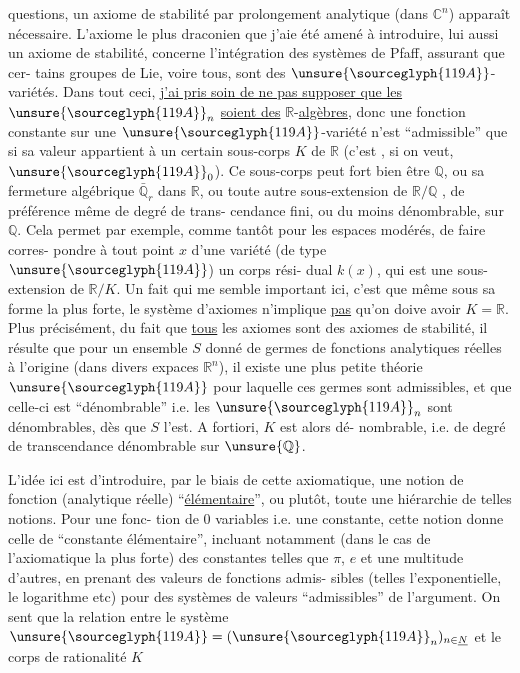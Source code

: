 
questions, un axiome de stabilité par prolongement analytique
(dans $\mathbb{C}^{n}$) apparaît nécessaire. L'axiome le plus draconien que
j'aie été amené à introduire, lui aussi un axiome de stabilité,
concerne l'intégration des systèmes de Pfaff, assurant que cer-%
tains groupes de Lie, voire tous, sont des $\unsure{\sourceglyph{119A}}$-variétés. Dans tout
ceci, \uline{j'ai pris soin de ne pas supposer que les} $\unsure{\sourceglyph{119A}}_{n}$ \uline{soient des}
\uline{$\mathbb{R}$}-\uline{algèbres}, donc une fonction constante sur une $\unsure{\sourceglyph{119A}}$-variété n'est
``admissible'' que si sa valeur appartient à un certain sous-corps
$K$ de $\mathbb{R}$ (c'est , si on veut, $\unsure{\sourceglyph{119A}}_{0}$). Ce sous-corps peut fort bien
être $\mathbb{Q}$, ou sa fermeture algébrique $\bar{\mathbb{Q}}_{r}$ dans $\mathbb{R}$, ou toute autre
sous-extension de $\mathbb{R}/\mathbb{Q}$ , de préférence même de degré de trans-%
cendance fini, ou du moins dénombrable, sur $\mathbb{Q}$. Cela permet par
exemple, comme tantôt pour les espaces modérés, de faire corres-%
pondre à tout point $x$ d'une variété (de type $\unsure{\sourceglyph{119A}}$) un corps rési-%
dual $k(x)$, qui est une sous-extension de $\mathbb{R}/K$. Un fait qui me
semble important ici, c'est que même sous sa forme la plus forte,
le système d'axiomes n'implique \uline{pas} qu'on doive avoir $K = \mathbb{R}$. Plus
précisément, du fait que \uline{tous} les axiomes sont des axiomes de
stabilité, il résulte que pour un ensemble $S$ donné de germes
de fonctions analytiques réelles à l'origine (dans divers expaces
$\mathbb{R}^{n}$), il existe une plus petite théorie $\unsure{\sourceglyph{119A}}$ pour laquelle ces germes
sont admissibles, et que celle-ci est ``dénombrable'' i.e. les $\unsure{\sourceglyph{119A}}_{n}$
sont dénombrables, dès que $S$ l'est. A fortiori, $K$ est alors dé-%
nombrable, i.e. de degré de transcendance dénombrable sur $\unsure{\mathbb{Q}}$.

L'idée ici est d'introduire, par le biais de cette
axiomatique, une notion de fonction (analytique réelle) ``\uline{élémentaire}'',
ou plutôt, toute une hiérarchie de telles notions. Pour une fonc-%
tion de 0 variables i.e. une constante, cette notion donne celle
de ``constante élémentaire'', incluant notamment (dans le cas de
l'axiomatique la plus forte) des constantes telles que $\pi$, $e$ et
une multitude d'autres, en prenant des valeurs de fonctions admis-%
sibles (telles l'exponentielle, le logarithme etc) pour des systèmes
de valeurs ``admissibles'' de l'argument. On sent que la relation
entre le système $\unsure{\sourceglyph{119A}} = (\unsure{\sourceglyph{119A}}_{n})_{n\in\underline{N}}$ et le corps de rationalité $K$

